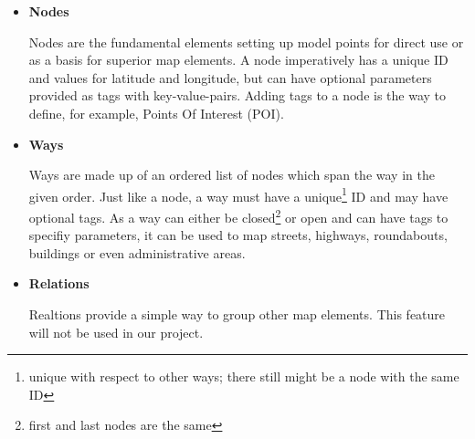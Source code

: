 \begin{itemize}

	\item \textbf{Nodes}
	
		Nodes are the fundamental elements setting up model points for direct use or as a basis for superior map elements. A node imperatively has a unique ID and values for latitude and longitude, but can have optional parameters provided as tags with key-value-pairs. Adding tags to a node is the way to define, for example, Points Of Interest (POI).
		
	\item \textbf{Ways}
	
		Ways are made up of an ordered list of nodes which span the way in the given order. Just like a node, a way must have a unique\footnote{unique with respect to other ways; there still might be a node with the same ID} ID and may have optional tags.\newline
		As a way can either be closed\footnote{first and last nodes are the same} or open and can have tags to specifiy parameters, it can be used to map streets, highways, roundabouts, buildings or even administrative areas.	
		
	\item \textbf{Relations}
	
		Realtions provide a simple way to group other map elements. This feature will not be used in our project.
	
\end{itemize}
